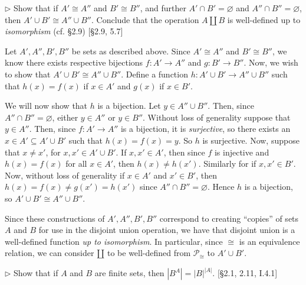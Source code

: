 \documentclass[12pt,letterpaper,boxed]{hmcpset}
\newcommand{\abs}[1]{\left|#1\right|}
\begin{document}
\hypertarget{Exercise I.2.9}{}
\begin{problem}[2.9]
	$\rhd$ Show that if $A'\cong A''$ and $B'\cong B''$, and further
	$A'\cap B'=\varnothing$ and $A''\cap B''=\varnothing$, then $A'\cup B'\cong A''\cup
	B''$. Conclude that the operation $A\amalg B$ is well-defined up to
	\textit{isomorphism} (cf. \S2.9) [\S2.9, 5.7]
\end{problem}

\begin{solution}
	Let $A',A'',B',B''$ be sets as described above. Since $A'\cong A''$ and $B'\cong
	B''$, we know there exists respective bijections $f:A'\to A''$ and $g:B'\to
	B''$. Now, we wish to show that $A'\cup B'\cong A''\cup B''$. Define a function
	$h:A'\cup B'\to A''\cup B''$ such that $h(x) = f(x)$ if $x\in A'$ and $g(x)$ if
	$x\in B'$.
	
	We will now show that $h$ is a bijection. Let $y\in A''\cup B''$. Then, since
	$A''\cap B''=\varnothing$, either $y\in A''$ or $y\in B''$. Without loss of
	generality suppose that $y\in A''$. Then, since $f:A'\to A''$ is a bijection, it
	is \textit{surjective}, so there exists an $x\in A'\subseteq A'\cup B'$ such
	that $h(x) = f(x) = y$. So $h$ is surjective. Now, suppose that $x\neq x'$, for
	$x,x'\in A'\cup B'$. If $x,x'\in A'$, then since $f$ is injective and $h(x) =
	f(x)$ for all $x\in A'$, then $h(x)\neq h(x')$. Similarly for if $x,x'\in B'$.
	Now, without loss of generality if $x\in A'$ and $x'\in B'$, then $h(x) = f(x)
	\neq g(x') = h(x')$ since $A''\cap B''=\varnothing$. Hence $h$ is a bijection, so
	$A'\cup B'\cong A''\cup B''$.
	
	Since these constructions of $A',A'',B',B''$ correspond to creating ``copies''
	of sets $A$ and $B$ for use in the disjoint union operation, we have that
	disjoint union is a well-defined function \textit{up to isomorphism}. In
	particular, since $\cong$ is an equivalence relation, we can consider $\amalg$
	to be well-defined from $\mathscr{P}_{\cong}$ to $A'\cup B'$.
\end{solution}


\hypertarget{Exercise I.2.10}{}
\begin{problem}[2.10]
	$\rhd$ Show that if $A$ and $B$ are finite sets, then $\abs{B^A} =
	\abs{B}^{\abs{A}}$. [\S2.1, 2.11, I.4.1]
\end{problem}
\end{document}
